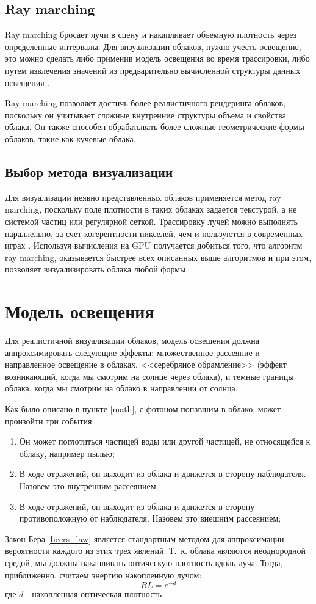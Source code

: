 \subsection{Ray marching}
\label{ray}
Ray marching бросает лучи в сцену и накапливает объемную плотность через определенные интервалы. Для визуализации облаков, нужно учесть освещение, это можно сделать либо применив модель освещения во время трассировки, либо путем извлечения значений из предварительно вычисленной структуры данных освещения \cite{hzd, frostbite, clouds}.

Ray marching позволяет достичь более реалистичного рендеринга облаков, поскольку он учитывает сложные внутренние структуры объема и свойства облака. Он также способен обрабатывать более сложные геометрические формы облаков, такие как кучевые облака.

\subsection{Выбор метода визуализации}
Для визуализации неявно представленных облаков применяется метод ray marching, поскольку поле плотности в таких облаках задается текстурой, а не системой частиц или регулярной сеткой. Трассировку лучей можно выполнять параллельно, за счет когерентности пикселей, чем и пользуются в современных играх \cite{hzd, frostbite}. Используя вычисления на GPU получается добиться того, что алгоритм ray marching, оказывается быстрее всех описанных выше алгоритмов и при этом, позволяет визуализировать облака любой формы.


\section{Модель освещения}

Для реалистичной визуализации облаков, модель освещения должна аппроксимировать следующие эффекты: множественное рассеяние и направленное освещение в облаках, <<серебряное обрамление>> (эффект возникающий, когда мы смотрим на солнце через облака), и темные границы облака, когда мы смотрим на облако в направлении от солнца. 

Как было описано в пункте \ref{math}, с фотоном попавшим в облако, может произойти три события:
\begin{enumerate}
	\item Он может поглотиться частицей воды или другой частицей, не относящейся к облаку, например пылью;
	\item В ходе отражений, он выходит из облака и движется в сторону наблюдателя. Назовем это внутренним рассеянием;
	\item В ходе отражений, он выходит из облака и движется в сторону противоположную от наблюдателя. Назовем это внешним рассеянием;
\end{enumerate}
Закон Бера \eqref{beers_law} является стандартным методом для аппроксимации вероятности каждого из этих трех явлений. Т.~к. облака являются неоднородной средой, мы должны накапливать оптическую плотность вдоль луча. Тогда, приближенно, считаем энергию накопленную лучом:
\begin{equation}
	\label{bl}
	BL = e ^ {-d}
\end{equation}
где $ d $ - накопленная оптическая плотность.


